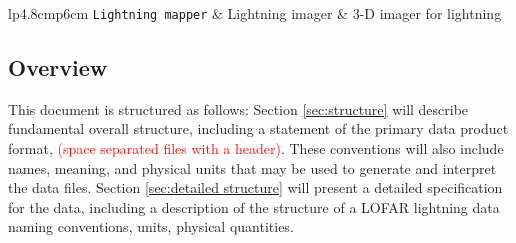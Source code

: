 \documentclass[a4paper,10pt,bibtotoc]{scrartcl}
\begin{document}
\begin{center}
  \tablelasttail{\hline}
  \begin{supertabular}{lp{4.8cm}p{6cm}}
    \shrinkheight{-4.5em}
    \texttt{Lightning mapper} \cite{tools.3} & Lightning imager &  3-D imager for lightning \\
    \hline
  \end{supertabular}
\end{center}

\subsection{Overview}
\label{sec:overview}


This document is structured as follows: %
Section \ref{sec:structure} will describe fundamental overall
structure, including a statement of the primary data product format,
\textcolor{red}{(space separated files with a header)}. These conventions will also include names, meaning, and physical units that may be used to generate and interpret the data files. %
Section \ref{sec:detailed structure} will present a detailed
specification for the data, including a description of the structure
of a LOFAR lightning data naming conventions, units, physical quantities. %

\end{document}
